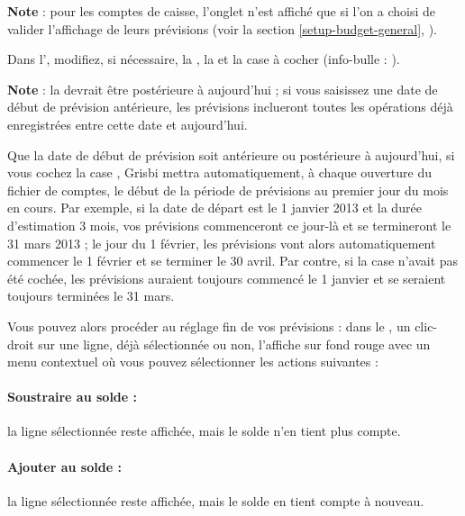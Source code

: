 \textbf{Note} : pour les comptes de caisse, l'onglet  n'est affiché  que si l'on a choisi de valider l'affichage de leurs prévisions (voir la section \vref{setup-budget-general}, ).

Dans l', modifiez, si nécessaire, la , la  et la case à cocher  (info-bulle : \og {}\fg{}). 

\textbf{Note} : la  devrait être postérieure à aujourd'hui ; si vous saisissez une date de début de prévision antérieure, les prévisions inclueront toutes les opérations déjà enregistrées entre cette date et aujourd'hui.

Que la date de début de prévision soit antérieure ou postérieure à aujourd'hui, si vous cochez la case , Grisbi  mettra automatiquement, à chaque ouverture du fichier de comptes, le début de la période de prévisions au premier jour du mois en cours. Par exemple, si la date de départ est le 1 janvier 2013 et la durée d'estimation 3 mois, vos prévisions commenceront ce jour-là et se termineront le 31 mars 2013 ; le jour du 1 février, les prévisions vont alors automatiquement commencer le 1 février et se terminer le 30 avril. Par contre, si la case n'avait pas été cochée, les prévisions auraient toujours commencé le 1 janvier et se seraient toujours terminées le 31 mars. 

Vous pouvez alors procéder au réglage fin de vos prévisions : dans le , un clic-droit sur une ligne, déjà sélectionnée ou non, l'affiche sur fond rouge{\couleur} avec un menu contextuel où vous pouvez sélectionner les actions suivantes :

\paragraph{Soustraire au solde :}la ligne sélectionnée reste affichée, mais le solde n'en tient plus compte.
 
\paragraph{Ajouter au solde :}la ligne sélectionnée reste affichée, mais le solde en tient compte à nouveau.


